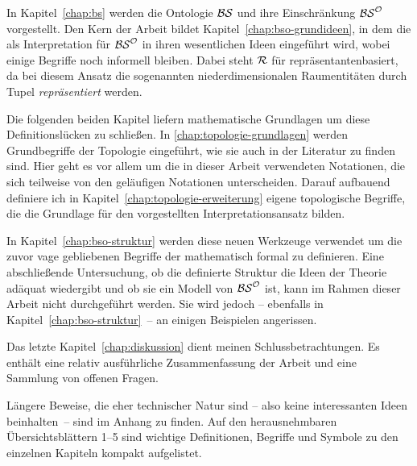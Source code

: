 In
Kapitel~\ref{chap:bs} werden die Ontologie $\mathcal{BS}$ und ihre Einschränkung $\mathcal{BS}^{\mathcal{O}}$ vorgestellt.
Den Kern der Arbeit bildet Kapitel~\ref{chap:bso-grundideen}, in dem die \strukt als Interpretation für $\mathcal{BS}^{\mathcal{O}}$ in ihren wesentlichen Ideen eingeführt wird, wobei einige Begriffe noch informell bleiben.
Dabei steht $\mathcal{R}$ für \glqq repräsentantenbasiert\grqq, da bei diesem Ansatz die sogenannten niederdimensionalen Raumentitäten durch Tupel \textit{repräsentiert} werden.

Die
folgenden beiden Kapitel liefern mathematische Grundlagen um diese Definitionslücken zu schließen.
In \ref{chap:topologie-grundlagen} werden Grundbegriffe der Topologie eingeführt, wie sie auch in der Literatur zu finden sind. Hier geht es vor allem um die in dieser Arbeit verwendeten Notationen, die sich teilweise von den geläufigen Notationen unterscheiden.
Darauf aufbauend definiere ich in Kapitel~\ref{chap:topologie-erweiterung} eigene topologische Begriffe, die die Grundlage für den vorgestellten Interpretationsansatz bilden.

In
Kapitel~\ref{chap:bso-struktur} werden diese neuen Werkzeuge verwendet um die zuvor vage gebliebenen Begriffe der \strukt mathematisch formal zu definieren.
Eine abschließende Untersuchung, ob die definierte Struktur die Ideen der Theorie adäquat wiedergibt und ob sie ein Modell von $\mathcal{BS}^{\mathcal{O}}$ ist, kann im Rahmen dieser Arbeit nicht durchgeführt werden.
Sie wird jedoch -- ebenfalls in Kapitel~\ref{chap:bso-struktur}~-- an einigen Beispielen angerissen.

Das
letzte Kapitel~\ref{chap:diskussion} dient meinen Schlussbetrachtungen.
Es enthält eine relativ ausführliche Zusammenfassung der Arbeit und eine Sammlung von offenen Fragen. %

Längere
Beweise, die eher technischer Natur sind -- also keine interessanten Ideen beinhalten~-- sind im Anhang zu finden.
Auf den herausnehmbaren Übersichtsblättern 1--5 sind wichtige Definitionen, Begriffe und Symbole zu den einzelnen Kapiteln kompakt aufgelistet.


